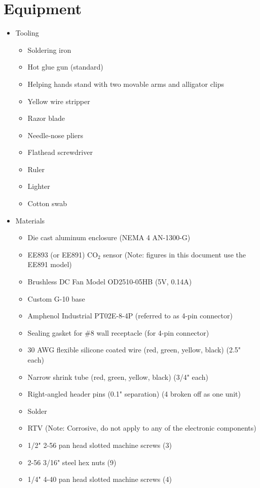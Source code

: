 \documentclass[letterpaper,12pt]{article}
\begin{document}
\section{Equipment}
	\begin{itemize}
		\item Tooling
    		\begin{itemize}
			\item Soldering iron
			\item Hot glue gun (standard)
			\item Helping hands stand with two movable arms and alligator clips
			\item Yellow wire stripper
			\item Razor blade
			\item Needle-nose pliers
			\item Flathead screwdriver
			\item Ruler
			\item Lighter
			\item Cotton swab
		\end{itemize}
		\item Materials
    		\begin{itemize}
			\item Die cast aluminum enclosure (NEMA 4 AN-1300-G)
			\item EE893 (or EE891) CO$_2$ sensor (Note: figures in this document use the EE891 model)
			\item Brushless DC Fan Model OD2510-05HB (5V, 0.14A)							
			\item Custom G-10 base
			\item Amphenol Industrial PT02E-8-4P (referred to as 4-pin connector)
			\item Sealing gasket for \#8 wall receptacle (for 4-pin connector)
			\item 30 AWG flexible silicone coated wire (red, green, yellow, black) (2.5" each)
			\item Narrow shrink tube (red, green, yellow, black) (3/4" each)
			\item Right-angled header pins (0.1" separation) (4 broken off as one unit)
			\item Solder
			\item RTV (Note: Corrosive, do not apply to any of the electronic components)
			\item 1/2" 2-56 pan head slotted machine screws (3)
			\item 2-56 3/16" steel hex nuts (9)
			\item 1/4" 4-40 pan head slotted machine screws (4)			
		\end{itemize}
	\end{itemize}
\end{document}

